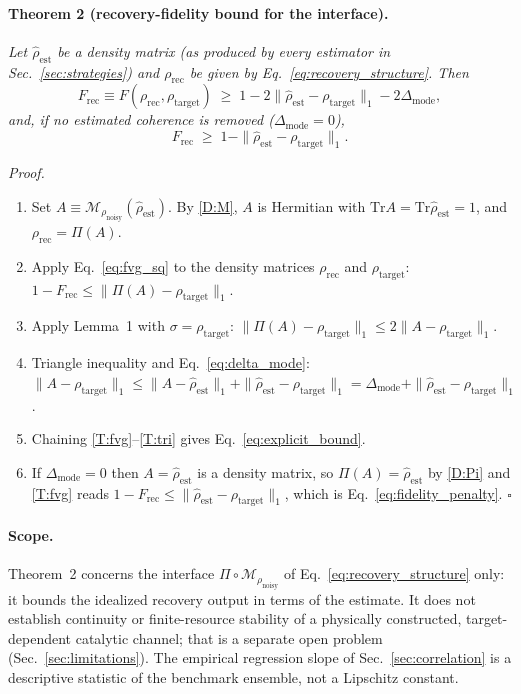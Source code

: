 \documentclass[12pt,a4paper]{article}
\newcommand{\tr}{\mathrm{Tr}}
\newcommand{\Frec}{F_\mathrm{rec}}
\newcommand{\rhot}{\rho_\mathrm{target}}
\newcommand{\rhon}{\rho_\mathrm{noisy}}
\newcommand{\rhor}{\rho_\mathrm{rec}}
\newcommand{\rhoe}{\hat{\rho}_\mathrm{est}}
\begin{document}
\paragraph{Theorem 2 (recovery-fidelity bound for the interface).}
\textit{Let $\rhoe$ be a density matrix (as produced by every estimator in Sec.~\ref{sec:strategies}) and $\rhor$ be given by Eq.~\eqref{eq:recovery_structure}. Then}
\begin{equation}
\Frec \equiv F(\rhor,\rhot) \;\geq\; 1 - 2\|\rhoe - \rhot\|_1 - 2\Delta_{\mathrm{mode}} ,
\label{eq:explicit_bound}
\end{equation}
\textit{and, if no estimated coherence is removed ($\Delta_{\mathrm{mode}} = 0$),}
\begin{equation}
\Frec \;\geq\; 1 - \|\rhoe - \rhot\|_1 .
\label{eq:fidelity_penalty}
\end{equation}

\noindent\textit{Proof.}
\begin{enumerate}[label=(T\arabic*),leftmargin=3em]
\item \label{T:A} Set $A \equiv \mathcal{M}_{\rhon}(\rhoe)$. By \ref{D:M}, $A$ is Hermitian with $\tr A = \tr\rhoe = 1$, and $\rhor = \Pi(A)$.
\item \label{T:fvg} Apply Eq.~\eqref{eq:fvg_sq} to the density matrices $\rhor$ and $\rhot$: $1 - \Frec \leq \|\Pi(A) - \rhot\|_1$.
\item \label{T:lemma} Apply Lemma~1 with $\sigma = \rhot$: $\|\Pi(A) - \rhot\|_1 \leq 2\|A - \rhot\|_1$.
\item \label{T:tri} Triangle inequality and Eq.~\eqref{eq:delta_mode}: $\|A - \rhot\|_1 \leq \|A - \rhoe\|_1 + \|\rhoe - \rhot\|_1 = \Delta_{\mathrm{mode}} + \|\rhoe - \rhot\|_1$.
\item \label{T:chain} Chaining \ref{T:fvg}--\ref{T:tri} gives Eq.~\eqref{eq:explicit_bound}.
\item \label{T:exact} If $\Delta_{\mathrm{mode}} = 0$ then $A = \rhoe$ is a density matrix, so $\Pi(A) = \rhoe$ by \ref{D:Pi} and \ref{T:fvg} reads $1 - \Frec \leq \|\rhoe - \rhot\|_1$, which is Eq.~\eqref{eq:fidelity_penalty}. \hfill$\square$
\end{enumerate}

\paragraph{Scope.}
Theorem~2 concerns the interface $\Pi\circ\mathcal{M}_{\rhon}$ of Eq.~\eqref{eq:recovery_structure} only: it bounds the idealized recovery output in terms of the estimate.
It does not establish continuity or finite-resource stability of a physically constructed, target-dependent catalytic channel; that is a separate open problem (Sec.~\ref{sec:limitations}).
The empirical regression slope of Sec.~\ref{sec:correlation} is a descriptive statistic of the benchmark ensemble, not a Lipschitz constant.
\end{document}
